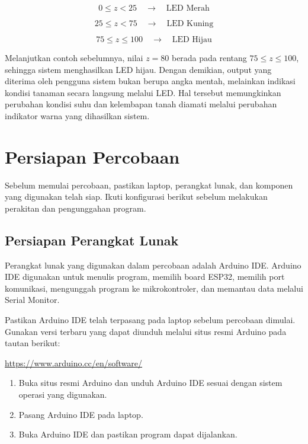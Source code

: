\documentclass[12pt,a4paper]{article}
\begin{document}
\[
0 \leq z < 25
\quad\rightarrow\quad
\text{LED Merah}
\]

\[
25 \leq z < 75
\quad\rightarrow\quad
\text{LED Kuning}
\]

\[
75 \leq z \leq 100
\quad\rightarrow\quad
\text{LED Hijau}
\]

Melanjutkan contoh sebelumnya, nilai $z=80$ berada pada rentang $75 \leq z \leq 100$, sehingga sistem menghasilkan LED hijau. Dengan demikian, output yang diterima oleh pengguna sistem bukan berupa angka mentah, melainkan indikasi kondisi tanaman secara langsung melalui LED. Hal tersebut memungkinkan perubahan kondisi suhu dan kelembapan tanah diamati melalui perubahan indikator warna yang dihasilkan sistem.

\section{Persiapan Percobaan}

Sebelum memulai percobaan, pastikan laptop, perangkat lunak, dan komponen yang digunakan telah siap. Ikuti konfigurasi berikut sebelum melakukan perakitan dan pengunggahan program.

\subsection{Persiapan Perangkat Lunak}

Perangkat lunak yang digunakan dalam percobaan adalah Arduino IDE. Arduino IDE digunakan untuk menulis program, memilih board ESP32, memilih port komunikasi, mengunggah program ke mikrokontroler, dan memantau data melalui Serial Monitor.

Pastikan Arduino IDE telah terpasang pada laptop sebelum percobaan dimulai. Gunakan versi terbaru yang dapat diunduh melalui situs resmi Arduino pada tautan berikut:

\url{https://www.arduino.cc/en/software/}

\begin{enumerate}
    \item Buka situs resmi Arduino dan unduh Arduino IDE sesuai dengan sistem operasi yang digunakan.
    \item Pasang Arduino IDE pada laptop.
    \item Buka Arduino IDE dan pastikan program dapat dijalankan.
\end{enumerate}
\end{document}
